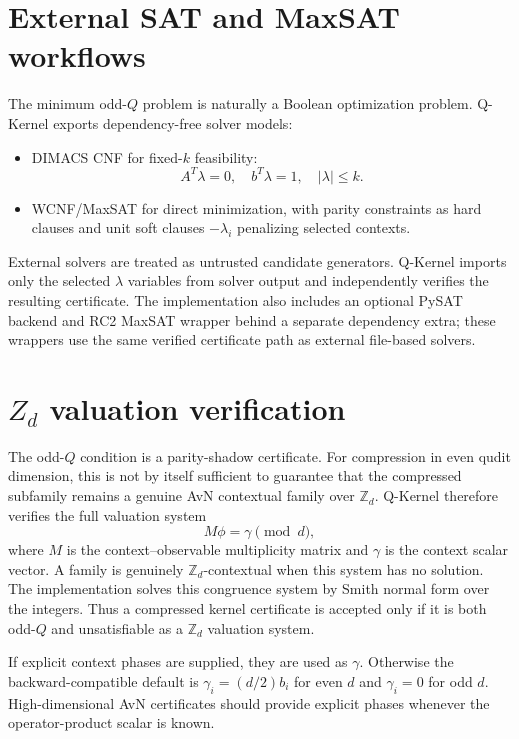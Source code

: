 \documentclass[11pt]{article}
\begin{document}
\section{External SAT and MaxSAT workflows}

The minimum odd-\(Q\) problem is naturally a Boolean optimization problem.  Q-Kernel exports dependency-free solver models:
\begin{itemize}[leftmargin=*]
  \item DIMACS CNF for fixed-\(k\) feasibility:
  \[
    A^T\lambda=0,\quad b^T\lambda=1,\quad |\lambda|\le k.
  \]
  \item WCNF/MaxSAT for direct minimization, with parity constraints as hard clauses and unit soft clauses \(-\lambda_i\) penalizing selected contexts.
\end{itemize}
External solvers are treated as untrusted candidate generators.  Q-Kernel imports only the selected \(\lambda\) variables from solver output and independently verifies the resulting certificate.  The implementation also includes an optional PySAT backend and RC2 MaxSAT wrapper behind a separate dependency extra; these wrappers use the same verified certificate path as external file-based solvers.


\section{\texorpdfstring{\(Z_d\)}{Zd} valuation verification}

The odd-\(Q\) condition is a parity-shadow certificate.  For compression in even qudit dimension, this is not by itself sufficient to guarantee that the compressed subfamily remains a genuine AvN contextual family over \(\mathbb{Z}_d\).  Q-Kernel therefore verifies the full valuation system
\[
  M\phi = \gamma \pmod d,
\]
where \(M\) is the context--observable multiplicity matrix and \(\gamma\) is the context scalar vector.  A family is genuinely \(\mathbb{Z}_d\)-contextual when this system has no solution.  The implementation solves this congruence system by Smith normal form over the integers.  Thus a compressed kernel certificate is accepted only if it is both odd-\(Q\) and unsatisfiable as a \(\mathbb{Z}_d\) valuation system.

If explicit context phases are supplied, they are used as \(\gamma\).  Otherwise the backward-compatible default is \(\gamma_i=(d/2)b_i\) for even \(d\) and \(\gamma_i=0\) for odd \(d\).  High-dimensional AvN certificates should provide explicit phases whenever the operator-product scalar is known.
\end{document}
